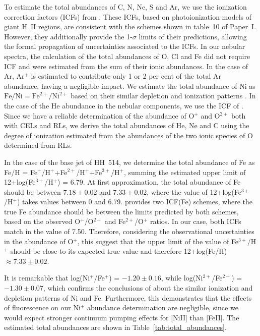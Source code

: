 \documentclass[fleqn,usenatbib]{mnras}
\begin{document}
To estimate the total abundances of C, N, Ne, S and Ar, we use the ionization correction factors (ICFs) from \citet{Amayo2021}. These ICFs, based on photoionization models of giant H~II regions, are consistent with the schemes shown in table~10 of Paper~I. However, they additionally provide the 1-$\sigma$ limits of their predictions, allowing the formal propagation of uncertainties associated to the ICFs. In our nebular spectra, the calculation of the total abundances of O, Cl and Fe did not require ICF and were estimated from the sum of their ionic abundances. In the case of Ar, Ar$^+$ is estimated to contribute only 1 or 2 per cent of the total Ar abundance, having a negligible impact. We estimate the total abundance of Ni as $\text{Fe/Ni}=\text{Fe}^{2+}/\text{Ni}^{2+}$ based on their similar depletion and ionization patterns \citep[][]{mendez2021-2}. In the case of the He abundance in the nebular components, we use the ICF of \citet{kunthsargent83}. Since we have a reliable determination of the abundance of O$^+$ and O$^{2+}$ both with CELs and RLs, we derive the total abundances of He, Ne and C using the degree of ionization estimated from the abundances of the two ionic species of O determined from RLs. 


In the case of the base jet of HH~514, we determine the total abundance of Fe as Fe/H = Fe$^{+}$/H$^{+}$+Fe$^{2+}$/H$^{+}$+Fe$^{3+}$/H$^{+}$, summing the estimated upper limit of 12+log(Fe$^{3+}$/H$^{+}$) = 6.79. At first approximation, the total abundance of Fe should be between $7.18 \pm 0.02$ and $7.33 \pm 0.02$, where the value of 12+log(Fe$^{3+}$/H$^{+}$) takes values between 0 and 6.79.  \citet{rodriguez05} provides two ICF(Fe) schemes, where the true Fe abundance should be between the limits predicted by both schemes, based on the observed O$^{+}$/O$^{2+}$ and Fe$^{2+}$/O$^{+}$ ratios. In our case, both ICFs match in the value of 7.50. Therefore, considering the observational uncertainties in the abundance of O$^{+}$, this suggest that the upper limit of the value of Fe$^{3+}$/H$^{+}$ should be close to its expected true value and therefore 12+log(Fe/H)$\approx 7.33 \pm 0.02$. 

It is remarkable that log(Ni$^{+}$/Fe$^{+}$) = $-1.20 \pm 0.16$, while log(Ni$^{2+}$/Fe$^{2+}$) = $-1.30 \pm 0.07$, which confirms the conclusions of \citet{mendez2021-2} about the similar ionization and depletion patterns of Ni and Fe. Furthermore, this demonstrates that the effects of fluorescence on our Ni$^{+}$ abundance determination are negligible, since we would expect stronger continuum pumping effects for [Ni\thinspace II] than [Fe\thinspace II]. The estimated total abundances are shown in Table~\ref{tab:total_abundances}.
\end{document}
